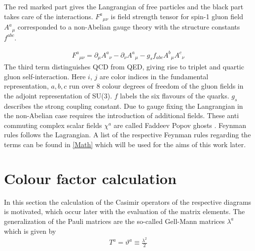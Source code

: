 The red marked part gives the Langrangian of free particles and the black part takes care of the interactions. ${F^a}_{\mu \nu}$ is field strength tensor for spin-1 gluon field $ {A^a}_{\mu} $ corresponded to a non-Abelian gauge theory with the structure constants $ f^{abc} $.

\begin{equation}
\begin{split}
{F^a}_{\mu \nu}= \partial_\mu {A^a}_{\nu}-\partial_\nu {A^a}_{\mu}-g_s f_{abc} {A^b}_{\mu} {A^c}_{\nu}
\end{split}
\end{equation}
The third term distinguishes QCD from QED, giving rise to triplet and quartic gluon self-interaction.
Here $i$, $j$ are color indices in the fundamental representation, $a, b , c$ run over 8 colour degrees of freedom of the gluon fields in the adjoint representation of SU(3). $f$ labels the six flavours of the quarks. $ g_s $ describes the strong coupling constant. Due to gauge fixing the Langrangian in the non-Abelian case requires the introduction of additional fields. These anti commuting complex scalar fields $ {\chi^a} $ are called Faddeev Popov ghosts \cite{Schwartz:2013pla, peskin2018introduction}. Feynman rules follows the Lagrangian. A list of the respective Feynman rules regarding the terms can be found in \ref{Math}  which will be used for the aims of this work later.

%

\label{Feynman}

\pagebreak

\section{Colour factor calculation}
\label{col}
In this section the calculation of the Casimir operators of the respective diagrams is motivated, which occur later with the evaluation of the matrix elements. The generalization of the Pauli matrices are the so-called Gell-Mann matrices $\lambda ^a$ which is given by \cite{Schwartz:2013pla, Platzer:2018pmd}
\begin{equation}
\begin{split}
T^a = \vartheta^a \equiv \frac{\lambda ^2}{2}
\end{split}
\end{equation}


